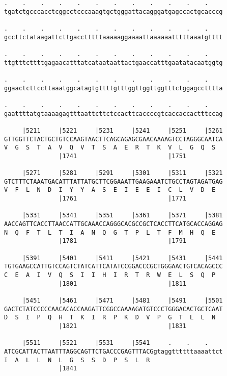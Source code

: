 \documentclass{article}
\begin{document}
\begin{Verbatim}
.    .    .    .    .    .    .    .    .    .    .    .    
tgatctgcccacctcggcctcccaaagtgctgggattacagggatgagccactgcacccg
                                                            
.    .    .    .    .    .    .    .    .    .    .    .    
gccttctataagattcttgacctttttaaaaaggaaaattaaaaaatttttaaatgtttt
                                                            
.    .    .    .    .    .    .    .    .    .    .    .    
ttgtttcttttgagaacatttatcataataattactgaaccatttgaatatacaatggtg
                                                            
.    .    .    .    .    .    .    .    .    .    .    .    
ggaactcttccttaaatggcatagtgttttgtttggttggttggtttctggagcctttta
                                                            
.    .    .    .    .    .    .    .    .    .    .    .    
gaattttatgtaaaagagtttaattcttctccacttcaccccgtcaccaccactttccag
                                                            
     |5211     |5221     |5231     |5241     |5251     |5261
GTTGGTTCTACTGCTGTCCAAGTAACTTCAGCAGAGCGAACAAAAGTCCTAGGGCAATCA
V  G  S  T  A  V  Q  V  T  S  A  E  R  T  K  V  L  G  Q  S  
               |1741                         |1751          
  
     |5271     |5281     |5291     |5301     |5311     |5321
GTCTTTCTAAATGACATTTATTATGCTTCGGAAATTGAAGAAATCTGCCTAGTAGATGAG
V  F  L  N  D  I  Y  Y  A  S  E  I  E  E  I  C  L  V  D  E  
               |1761                         |1771          
  
     |5331     |5341     |5351     |5361     |5371     |5381
AACCAGTTCACCTTAACCATTGCAAACCAGGGCACGCCGCTCACCTTCATGCACCAGGAG
N  Q  F  T  L  T  I  A  N  Q  G  T  P  L  T  F  M  H  Q  E  
               |1781                         |1791          
  
     |5391     |5401     |5411     |5421     |5431     |5441
TGTGAAGCCATTGTCCAGTCTATCATTCATATCCGGACCCGCTGGGAACTGTCACAGCCC
C  E  A  I  V  Q  S  I  I  H  I  R  T  R  W  E  L  S  Q  P  
               |1801                         |1811          
  
     |5451     |5461     |5471     |5481     |5491     |5501
GACTCTATCCCCCAACACACCAAGATTCGGCCAAAAGATGTCCCTGGGACACTGCTCAAT
D  S  I  P  Q  H  T  K  I  R  P  K  D  V  P  G  T  L  L  N  
               |1821                         |1831          
  
     |5511     |5521     |5531     |5541     .    .    .    
ATCGCATTACTTAATTTAGGCAGTTCTGACCCGAGTTTACGgtaggttttttaaaattct
I  A  L  L  N  L  G  S  S  D  P  S  L  R                    
               |1841                                        
  

\end{Verbatim}
\end{document}
